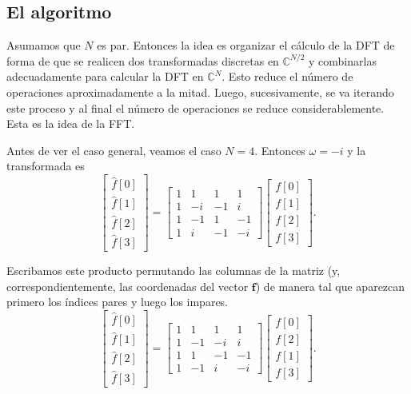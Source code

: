 \documentclass[12pt, a4paper]{amsbook}
\newcommand{\C}{{\mathbb C}}
\newcommand{\ff}{{\mathbf f}}
\theoremstyle{remark}
\theoremstyle{definition}
\numberwithin{section}{chapter}
\numberwithin{subsection}{section}
\numberwithin{equation}{section}
\numberwithin{figure}{chapter}
\begin{document}
\subsection{El algoritmo}

Asumamos que $N$ es par. Entonces la idea es organizar el cálculo de la DFT de forma de que se realicen dos transformadas discretas en $\C^{N/2}$ y combinarlas adecuadamente para calcular la DFT en $\C^N$. Esto reduce el número de operaciones aproximadamente a la mitad. Luego, sucesivamente, se va iterando este proceso y al final el número de operaciones se reduce considerablemente. Esta es la idea de la FFT.

Antes de ver el caso general, veamos el caso $N=4$. Entonces $\omega=-i$ y la transformada es
$$
\begin{bmatrix}
\hat f[0]\\
\hat f[1]\\
\hat f[2]\\
\hat f[3]
\end{bmatrix}
= 
\begin{bmatrix}
1 & 1 & 1 & 1\\
1 & -i & -1 & i\\
1 & -1 & 1 & -1\\
1 & i & -1 & -i
\end{bmatrix}
\begin{bmatrix}
f[0]\\
f[1]\\
f[2]\\
f[3]
\end{bmatrix}.
$$

Escribamos este producto permutando las columnas de la matriz (y, correspondientemente, las coordenadas del vector $\ff$) de manera tal que aparezcan primero los índices pares y luego los impares.
$$
\begin{bmatrix}
\hat f[0]\\
\hat f[1]\\
\hat f[2]\\
\hat f[3]
\end{bmatrix}
= 
\begin{bmatrix}
1 & 1 & 1 & 1\\
1 & -1 & -i & i\\
1 & 1 & -1 & -1\\
1 & -1 & i & -i
\end{bmatrix}
\begin{bmatrix}
f[0]\\
f[2]\\
f[1]\\
f[3]
\end{bmatrix}.
$$
\end{document}
